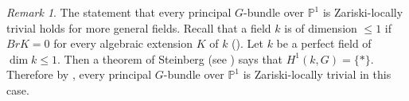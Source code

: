 \documentclass{amsart}
\newcommand{\cE}{\mathcal{E}}
\theoremstyle{plain}
\newtheorem{lemma}[theorem]{Lemma}
\theoremstyle{definition}
\theoremstyle{remark}
\newtheorem{remark}{Remark}[section]
\begin{document}
\begin{remark}
The statement that every principal $G$-bundle over $\mathbb{P}^1$ is Zariski-locally trivial holds for more general fields.
Recall that a field $k$ is of dimension $\leq 1$ if $Br K=0$ for every algebraic extension $K$ of $k$ (\cite[Proposition 1.5.25]{Poo}). Let $k$ be a perfect field of $\dim k\leq 1$. Then a theorem of Steinberg (see \cite[Theorem 1.9]{Ste}) says that $H^{1}(k,G)=\{*\}$. Therefore by \cite[Theorem 3.8a)]{Gi}, every principal $G$-bundle over $\mathbb{P}^1$ is Zariski-locally trivial in this case.
\end{remark}
\end{document}
